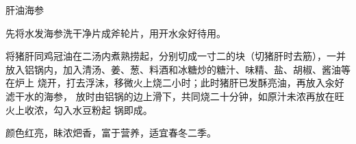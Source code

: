 %
%
%
%
%
%
%
\begin{recipe}{肝油海参}

\ingredients


\preparation

\step 先将水发海参洗干净片成斧轮片，用开水汆好待用。

\step 将猪肝同鸡冠油在二汤内煮熟捞起，分别切成一寸二的块（切猪肝时去筋），一并
放入铝锅内，加入清汤、姜、葱、料酒和冰糖炒的糖汁、味精、盐、胡椒、酱油等在炉上
烧开，打去浮沫，移微火上烧二小时；此时猪肝已发酥亮油，再放入汆好滤干水的海参，
放时由铝锅的边上滑下，共同烧二十分钟，如原汁未浓再放在旺火上收浓，勾入水豆粉起
锅即成。

\features

颜色红亮，眛浓𤆵香，富于营养，适宜春冬二季。

\end{recipe}

